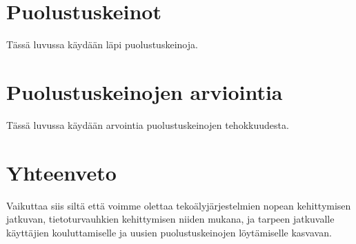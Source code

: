 \section*{Puolustuskeinot}

Tässä luvussa käydään läpi puolustuskeinoja.

\section*{Puolustuskeinojen arviointia}

Tässä luvussa käydään arvointia puolustuskeinojen tehokkuudesta.

\section*{Yhteenveto}

Vaikuttaa siis siltä että voimme olettaa tekoälyjärjestelmien nopean kehittymisen jatkuvan, tietoturvauhkien kehittymisen niiden mukana, ja tarpeen jatkuvalle käyttäjien kouluttamiselle ja uusien puolustuskeinojen löytämiselle kasvavan.